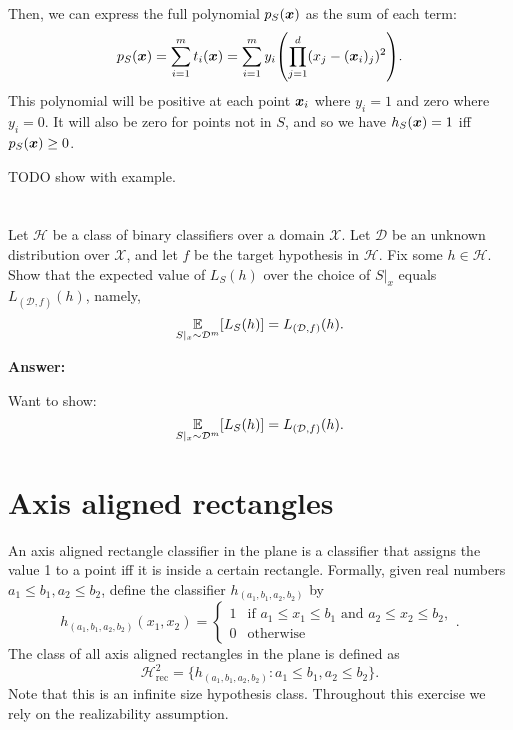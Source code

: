 \documentclass{article}
\begin{document}
Then, we can express the full polynomial $p_S(\bm{x})$ as the sum of each term:
$$p_S(\vct{x}) = \sum_{i=1}^m t_i(\vct{x}) = \sum_{i=1}^m y_i\left(\prod_{j=1}^{d} (x_j - (\vct{x}_i)_j)^2\right).$$
This polynomial will be positive at each point $\bm{x}_i$ where $y_i = 1$ and zero where $y_i = 0$.
It will also be zero for points not in $S$, and so we have $h_S(\bm{x}) = 1$ iff $p_S(\bm{x}) \geq 0$.

TODO show with example.

\section{}

Let $\mathcal{H}$ be a class of binary classiﬁers over a domain $\mathcal{X}$.
Let $\mathcal{D}$ be an unknown distribution over $\mathcal{X}$, and let $f$ be the target hypothesis in $\mathcal{H}$.
Fix some $h \in \mathcal{H}$.
Show that the expected value of $L_S(h)$ over the choice of $S|_x$ equals $L_{(\mathcal{D},f)}(h)$, namely,
$$\displaystyle\mathop{\operatorname{\mathbb{E}}}_{S|_x\sim \mathcal{D}^m}[L_S(h)] = L_{(\mathcal{D},f)}(h).$$

\textbf{Answer:}

Want to show:
$$\displaystyle\mathop{\operatorname{\mathbb{E}}}_{S|_x\sim \mathcal{D}^m}[L_S(h)] = L_{(\mathcal{D},f)}(h).$$

\section{Axis aligned rectangles}

An axis aligned rectangle classiﬁer in the plane
is a classiﬁer that assigns the value 1 to a point iff it is inside a
certain rectangle. Formally, given real numbers $a_1 \leq b_1, a_2 \leq b_2$, define the classifier $h_{(a_1,b_1,a_2,b_2)}$ by
$$h_{(a_1,b_1,a_2,b_2)}(x_1,x_2) = \begin{cases}
1 & \text{if } a_1 \leq x_1 \leq b_1 \text{ and } a_2 \leq x_2 \leq b_2,\\
0 & \text{otherwise}
\end{cases}.$$
The class of all axis aligned rectangles in the plane is deﬁned as
$$\mathcal{H}^2_{\text{rec}} = \{h_{(a_1,b_1,a_2,b_2)} : a_1 \leq b_1, a_2 \leq b_2\}.$$
Note that this is an inﬁnite size hypothesis class.
Throughout this exercise we rely on the realizability assumption.
\end{document}
